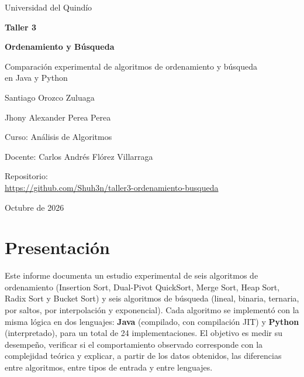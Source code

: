 \documentclass[11pt,a4paper]{article}
\begin{document}
\begin{titlepage}
  \centering
  \vspace*{2.2cm}
  {\large Universidad del Quind\'io\par}
  \vspace{2.2cm}
  {\Huge\bfseries Taller 3\par}
  \vspace{0.4cm}
  {\LARGE\bfseries Ordenamiento y B\'usqueda\par}
  \vspace{0.6cm}
  {\large Comparaci\'on experimental de algoritmos de ordenamiento y b\'usqueda\\en Java y Python\par}
  \vspace{2.6cm}
  {\large Santiago Orozco Zuluaga\par}
  {\large Jhony Alexander Perea Perea\par}
  \vspace{1.6cm}
  {\large Curso: An\'alisis de Algoritmos\par}
  {\large Docente: Carlos Andr\'es Fl\'orez Villarraga\par}
  \vspace{0.6cm}
  {\large Repositorio:\\ \url{https://github.com/Shuh3n/taller3-ordenamiento-busqueda}\par}
  \vfill
  {\large Octubre de 2026\par}
\end{titlepage}

\tableofcontents
\clearpage

\section{Presentaci\'on}

Este informe documenta un estudio experimental de seis algoritmos de ordenamiento (Insertion Sort,
Dual-Pivot QuickSort, Merge Sort, Heap Sort, Radix Sort y Bucket Sort) y seis algoritmos de b\'usqueda
(lineal, binaria, ternaria, por saltos, por interpolaci\'on y exponencial). Cada algoritmo se implement\'o
con la misma l\'ogica en dos lenguajes: \textbf{Java} (compilado, con compilaci\'on JIT) y \textbf{Python}
(interpretado), para un total de 24 implementaciones. El objetivo es medir su desempe\~no, verificar si el
comportamiento observado corresponde con la complejidad te\'orica y explicar, a partir de los datos
obtenidos, las diferencias entre algoritmos, entre tipos de entrada y entre lenguajes.
\end{document}
